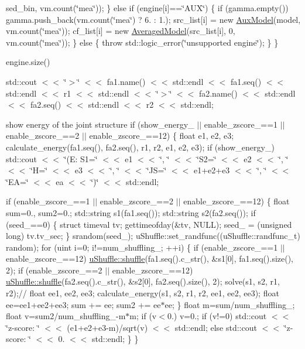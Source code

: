 sed\+\_\+bin, vm.\+count(\char`\"{}mea\char`\"{})); \} else if (engine\mbox{[}i\mbox{]}==\char`\"{}\+A\+U\+X\char`\"{}) \{ if (gamma.\+empty()) gamma.\+push\+\_\+back(vm.\+count(\char`\"{}mea\char`\"{}) ? 6. \+: 1.); src\+\_\+list\mbox{[}i\mbox{]} = new \hyperlink{class_aux_model}{Aux\+Model}(model, vm.\+count(\char`\"{}mea\char`\"{})); cf\+\_\+list\mbox{[}i\mbox{]} = new \hyperlink{class_averaged_model}{Averaged\+Model}(src\+\_\+list\mbox{[}i\mbox{]}, 0, vm.\+count(\char`\"{}mea\char`\"{})); \} else \{ throw std\+::logic\+\_\+error(\char`\"{}unsupported engine\char`\"{}); \} \}

engine.\+size()

std\+::cout $<$$<$ \char`\"{}$>$\char`\"{} $<$$<$ fa1.\+name() $<$$<$ std\+::endl $<$$<$ fa1.\+seq() $<$$<$ std\+::endl $<$$<$ r1 $<$$<$ std\+::endl $<$$<$ \char`\"{}$>$\char`\"{} $<$$<$ fa2.\+name() $<$$<$ std\+::endl $<$$<$ fa2.\+seq() $<$$<$ std\+::endl $<$$<$ r2 $<$$<$ std\+::endl;

show energy of the joint structure if (show\+\_\+energy\+\_\+ $\vert$$\vert$ enable\+\_\+zscore\+\_\+==1 $\vert$$\vert$ enable\+\_\+zscore\+\_\+==2 $\vert$$\vert$ enable\+\_\+zscore\+\_\+==12) \{ float e1, e2, e3; calculate\+\_\+energy(fa1.\+seq(), fa2.\+seq(), r1, r2, e1, e2, e3); if (show\+\_\+energy\+\_\+) std\+::cout $<$$<$ \char`\"{}(\+E\+: S1=\char`\"{} $<$$<$ e1 $<$$<$ \char`\"{}, \char`\"{} $<$$<$ \char`\"{}\+S2=\char`\"{} $<$$<$ e2 $<$$<$ \char`\"{}, \char`\"{} $<$$<$ \char`\"{}\+H=\char`\"{} $<$$<$ e3 $<$$<$ \char`\"{}, \char`\"{} $<$$<$ \char`\"{}\+J\+S=\char`\"{} $<$$<$ e1+e2+e3 $<$$<$ \char`\"{}, \char`\"{} $<$$<$ \char`\"{}\+E\+A=\char`\"{} $<$$<$ ea $<$$<$ \char`\"{})\char`\"{} $<$$<$ std\+::endl;

if (enable\+\_\+zscore\+\_\+==1 $\vert$$\vert$ enable\+\_\+zscore\+\_\+==2 $\vert$$\vert$ enable\+\_\+zscore\+\_\+==12) \{ float sum=0., sum2=0.; std\+::string s1(fa1.\+seq()); std\+::string s2(fa2.\+seq()); if (seed\+\_\+==0) \{ struct timeval tv; gettimeofday(\&tv, N\+U\+L\+L); seed\+\_\+ = (unsigned long) tv.\+tv\+\_\+sec; \} srandom(seed\+\_\+); u\+Shuffle\+::set\+\_\+randfunc((u\+Shuffle\+::randfunc\+\_\+t) random); for (uint i=0; i!=num\+\_\+shuffling\+\_\+; ++i) \{ if (enable\+\_\+zscore\+\_\+==1 $\vert$$\vert$ enable\+\_\+zscore\+\_\+==12) \hyperlink{namespaceu_shuffle_a56a75029d26fb72eb38a0507ffa81004}{u\+Shuffle\+::shuffle}(fa1.\+seq().c\+\_\+str(), \&s1\mbox{[}0\mbox{]}, fa1.\+seq().size(), 2); if (enable\+\_\+zscore\+\_\+==2 $\vert$$\vert$ enable\+\_\+zscore\+\_\+==12) \hyperlink{namespaceu_shuffle_a56a75029d26fb72eb38a0507ffa81004}{u\+Shuffle\+::shuffle}(fa2.\+seq().c\+\_\+str(), \&s2\mbox{[}0\mbox{]}, fa2.\+seq().size(), 2); solve(s1, s2, r1, r2);// float ee1, ee2, ee3; calculate\+\_\+energy(s1, s2, r1, r2, ee1, ee2, ee3); float ee=ee1+ee2+ee3; sum += ee; sum2 += ee$\ast$ee; \} float m=sum/num\+\_\+shuffling\+\_\+; float v=sum2/num\+\_\+shuffling\+\_\+-\/m$\ast$m; if (v$<$0.) v=0.; if (v!=0) std\+::cout $<$$<$ \char`\"{}z-\/score\+: \char`\"{} $<$$<$ (e1+e2+e3-\/m)/sqrt(v) $<$$<$ std\+::endl; else std\+::cout $<$$<$ \char`\"{}z-\/score\+: \char`\"{} $<$$<$ 0. $<$$<$ std\+::endl; \} \}

